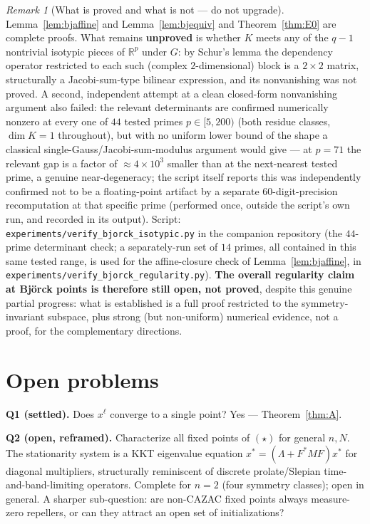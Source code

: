\documentclass[11pt]{article}
\theoremstyle{plain}
\theoremstyle{definition}
\theoremstyle{remark}
\newtheorem{remark}[theorem]{Remark}
\newcommand{\R}{\mathbb R}
\begin{document}
\begin{remark}[What is proved and what is not --- do not upgrade]
Lemma~\ref{lem:bjaffine} and Lemma~\ref{lem:bjequiv} and
Theorem~\ref{thm:E0} are complete proofs. What remains \textbf{unproved} is
whether $K$ meets any of the $q-1$ nontrivial isotypic pieces of $\R^p$
under $G$: by Schur's lemma the dependency operator restricted to each
such (complex $2$-dimensional) block is a $2\times2$ matrix, structurally a
Jacobi-sum-type bilinear expression, and its nonvanishing was not proved.
A second, independent attempt at a clean closed-form nonvanishing argument
also failed: the relevant determinants are confirmed numerically nonzero
at every one of $44$ tested primes $p\in[5,200)$ (both residue classes,
$\dim K=1$ throughout), but with no uniform lower bound of the shape a
classical single-Gauss/Jacobi-sum-modulus argument would give --- at
$p=71$ the relevant gap is a factor of $\approx4\times10^3$ smaller than
at the next-nearest tested prime, a genuine near-degeneracy; the script
itself reports this was independently confirmed not to be a floating-point
artifact by a separate $60$-digit-precision recomputation at that specific
prime (performed once, outside the script's own run, and recorded in its
output). Script: {\tt experiments/verify\_bjorck\_isotypic.py} in the
companion repository \cite{CazacAlgorithmRepo} (the $44$-prime
determinant check; a separately-run set of $14$ primes, all contained in
this same tested range, is used for the affine-closure check of
Lemma~\ref{lem:bjaffine}, in {\tt experiments/verify\_bjorck\_regularity.py}).
\textbf{The overall regularity
claim at Bj\"orck points is therefore still open, not proved}, despite this
genuine partial progress: what is established is a full proof restricted
to the symmetry-invariant subspace, plus strong (but non-uniform)
numerical evidence, not a proof, for the complementary directions.
\end{remark}

\section{Open problems}\label{sec:open}

\noindent\textbf{Q1 (settled).} Does $x^\ell$ converge to a single point? Yes ---
Theorem~\ref{thm:A}.

\noindent\textbf{Q2 (open, reframed).} Characterize all fixed points of $(\star)$
for general $n,N$. The stationarity system is a KKT eigenvalue equation
$x^*=(\Lambda+F^*MF)x^*$ for diagonal multipliers, structurally reminiscent
of discrete prolate/Slepian time-and-band-limiting operators. Complete for
$n=2$ (four symmetry classes); open in general. A sharper sub-question:
are non-CAZAC fixed points always measure-zero repellers, or can they
attract an open set of initializations?
\end{document}

